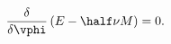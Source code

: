 \begin{equation} \label{LLstateqn}
  \frac{\delta}{\delta\vphi} \left(E-\half\nu M\right) = 0.
\end{equation}


